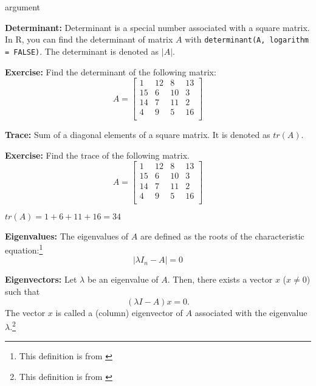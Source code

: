 \begin{labeling}{argument}
    \item[\textbf{Determinant:}] Determinant is a special number associated with a square matrix. In R, you can find the determinant of matrix $A$ with \verb|determinant(A, logarithm = FALSE)|. The determinant is denoted as $|A|$.

    \textbf{Exercise:} Find the determinant of the following matrix:
    \[
        A = \begin{bmatrix}
            1  & 12 & 8  & 13 \\
            15 & 6  & 10 & 3  \\
            14 & 7  & 11 & 2  \\
            4  & 9  & 5  & 16 \\
        \end{bmatrix}
    \]

    \begin{sol}
        
    \end{sol}

    \item[\textbf{Trace:}] Sum of a diagonal elements of a square matrix. It is denoted as $tr(A)$.

    \textbf{Exercise:} Find the trace of the following matrix.
    \[
        A = \begin{bmatrix}
            1  & 12 & 8  & 13 \\
            15 & 6  & 10 & 3  \\
            14 & 7  & 11 & 2  \\
            4  & 9  & 5  & 16 \\
        \end{bmatrix}
    \]

    \begin{sol}
        $tr(A) = 1 + 6 + 11 + 16 = 34$
    \end{sol}

    \item[\textbf{Eigenvalues:}] The eigenvalues of $A$ are defined as the roots of the characteristic equation:\footnote{This definition is from \cite[][page 12]{MagnusNeudecker-2019-part1}}
    \[ |\lambda I_n - A| = 0 \]

    \item[\textbf{Eigenvectors:}] Let $\lambda$ be an eigenvalue of $A$. Then, there exists a vector $x$ ($x \neq 0$) such that
    \[ (\lambda I - A) x = 0. \]
    The vector $x$ is called a (column) eigenvector of $A$ associated with the eigenvalue $\lambda$.\footnote{This definition is from \cite[][page 12]{MagnusNeudecker-2019-part1}}


\end{labeling}
